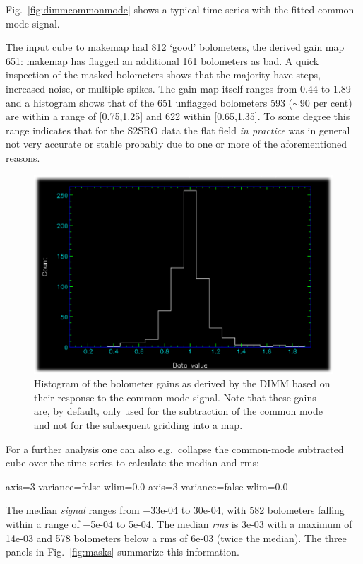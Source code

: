\documentclass[twoside,11pt]{starlink}
\providecommand{\about}{$\sim$}
\begin{document}
Fig.~\ref{fig:dimmcommonmode} shows a typical time series with the
fitted common-mode signal.

The input cube to makemap had 812 `good' bolometers, the derived gain
map 651: makemap has flagged an additional 161 bolometers as bad.  A
quick inspection of the masked bolometers shows that the majority have
steps, increased noise, or multiple spikes.  The gain map itself
ranges from 0.44 to 1.89 and a histogram shows that of the 651
unflagged bolometers 593 (\about90 per cent) are within a range of
[0.75,1.25] and 622 within [0.65,1.35]. To some degree this range
indicates that for the S2SRO data the flat field \textsl{in practice}
was in general not very accurate or stable probably due to one or more
of the aforementioned reasons.

\begin{figure}[ht]
\begin{center}
\includegraphics[width=0.45\linewidth]{sc19_gain_histogram}
\caption{Histogram of the bolometer gains as derived by the DIMM
based on their response to the common-mode signal. Note that these
gains are, by default, only used for the subtraction of the common
mode and not for the subsequent gridding into a map.}
\label{fig:gainhistogram}
\end{center}
\end{figure}

For a further analysis one can also e.g.\ collapse the common-mode
subtracted cube over the time-series to calculate the median and rms:

\begin{terminalv}
           axis=3 variance=false wlim=0.0
           axis=3 variance=false wlim=0.0
\end{terminalv}

The median \textsl{signal} ranges from $-$33e-04 to 30e-04, with 582
bolometers falling within a range of $-$5e-04 to 5e-04. The median
\textsl{rms} is 3e-03 with a maximum of 14e-03 and 578 bolometers
below a rms of 6e-03 (twice the median).  The three panels in
Fig.~\ref{fig:masks} summarize this information.
\end{document}
